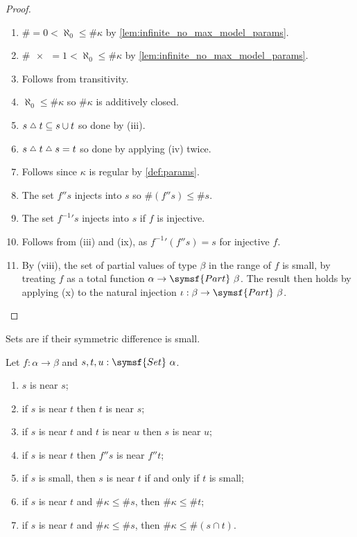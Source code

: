 \begin{proof}
    \begin{enumerate}
        \item \( \#\qty{} = 0 < \aleph_0 \leq \#\kappa \) by \cref{lem:infinite_no_max_model_params}.
        \item \( \#\qty{x} = 1 < \aleph_0 \leq \#\kappa \) by \cref{lem:infinite_no_max_model_params}.
        \item Follows from transitivity.
        \item \( \aleph_0 \leq \#\kappa \) so \( \#\kappa \) is additively closed.
        \item \( s \symmdiff t \subseteq s \cup t \) so done by (iii).
        \item \( s \symmdiff t \symmdiff s = t \) so done by applying (iv) twice.
        \item Follows since \( \kappa \) is regular by \cref{def:params}.
        \item The set \( f '' s \) injects into \( s \) so \( \#(f '' s) \leq \#s \).
        \item The set \( f^{-1}{}' s \) injects into \( s \) if \( f \) is injective.
        \item Follows from (iii) and (ix), as \( f^{-1}{}' (f '' s) = s \) for injective \( f \).
        \item By (viii), the set of partial values of type \( \beta \) in the range of \( f \) is small, by treating \( f \) as a total function \( \alpha \to \symsf{Part}\ \beta \).
        The result then holds by applying (x) to the natural injection \( \iota : \beta \to \symsf{Part}\ \beta \).
    \end{enumerate}
\end{proof}
\begin{definition}
    Sets are  if their symmetric difference is small.
\end{definition}
\begin{lemma}
    \label{lem:near}
    Let \( f \colon \alpha \to \beta \) and \( s, t, u : \symsf{Set}\ \alpha \).
    \begin{enumerate}
        \item \( s \) is near \( s \);
        \item if \( s \) is near \( t \) then \( t \) is near \( s \);
        \item if \( s \) is near \( t \) and \( t \) is near \( u \) then \( s \) is near \( u \);
        \item if \( s \) is near \( t \) then \( f '' s \) is near \( f '' t \);
        \item if \( s \) is small, then \( s \) is near \( t \) if and only if \( t \) is small;
        \item if \( s \) is near \( t \) and \( \#\kappa \leq \#s \), then \( \#\kappa \leq \#t \);
        \item if \( s \) is near \( t \) and \( \#\kappa \leq \#s \), then \( \#\kappa \leq \#(s \cap t) \).
    \end{enumerate}
\end{lemma}
